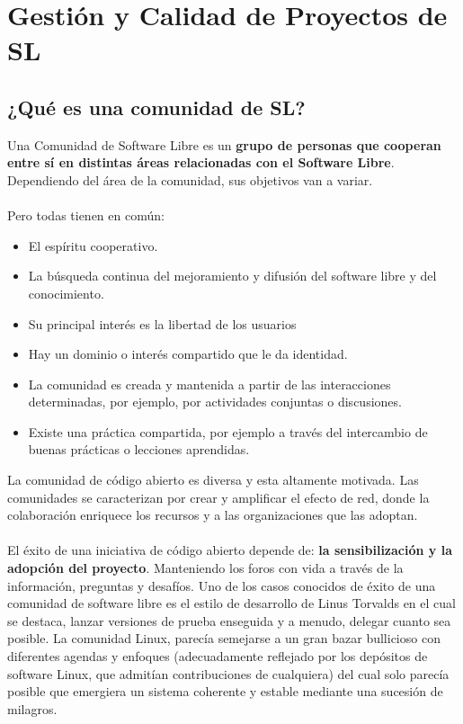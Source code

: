 \documentclass{book}
\author{AMURA FEDERICO - BACINELLO FRANCO - FONZALIDA SANTIAGO - CARBALLO EMMANUEL - DAVID VIRGOLINI - ROSALES MARCIO}
\begin{document}
\chapter{Gestión y Calidad de Proyectos de SL}
\section{¿Qué es una comunidad de SL?}

Una Comunidad de Software Libre es un {\bf grupo de personas que cooperan entre sí en distintas áreas relacionadas con el Software Libre}. Dependiendo del área de la comunidad, sus objetivos van a variar.
\\
\\
Pero todas tienen en común:

\begin{itemize}
     \item El espíritu cooperativo. 
     \item La búsqueda continua del mejoramiento y difusión del software libre y del conocimiento.
     \item Su principal interés es la libertad de los usuarios
     \item Hay un dominio o interés compartido que le da identidad.
     \item La comunidad es creada y mantenida a partir de las interacciones determinadas, por ejemplo, por actividades conjuntas o discusiones.
     \item Existe una práctica compartida, por ejemplo a través del intercambio de buenas prácticas o lecciones aprendidas.
\end{itemize}

La comunidad de código abierto es diversa y esta altamente motivada. Las comunidades se caracterizan por crear y amplificar el efecto de red, donde la colaboración enriquece los recursos y a las organizaciones que las adoptan.
\\
\\
El éxito de una iniciativa de código abierto depende de: {\bf la sensibilización y la adopción del proyecto}. Manteniendo los foros con vida a través de la información, preguntas y desafíos.
\pagebreak
Uno de los casos conocidos de éxito de una comunidad de software libre es el estilo de desarrollo de Linus Torvalds en el cual se destaca, lanzar versiones de prueba enseguida y a menudo, delegar cuanto sea posible. La comunidad Linux, parecía semejarse a un gran bazar bullicioso con diferentes agendas y enfoques (adecuadamente reflejado por los depósitos de software Linux, que admitían contribuciones de cualquiera) del cual solo parecía posible que emergiera un sistema coherente y estable mediante una sucesión de milagros. 
\end{document}
